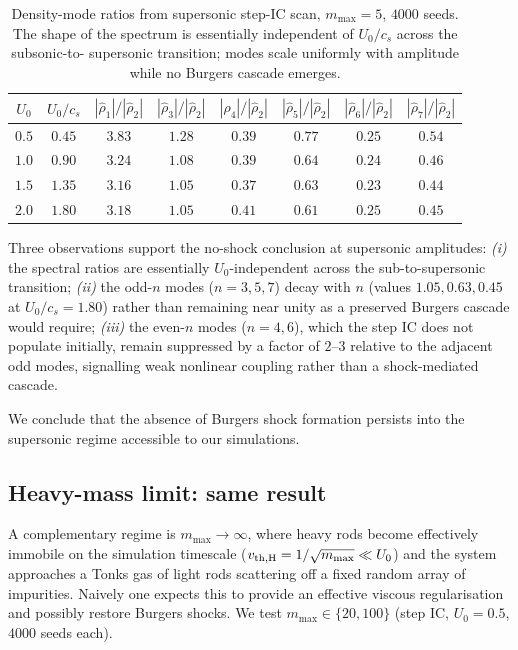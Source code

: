 \documentclass[aps,pre,twocolumn,superscriptaddress,longbibliography,floatfix]{revtex4-2}
\begin{document}
\begin{table}[t]
\centering
\caption{Density-mode ratios from supersonic step-IC scan,
$m_{\max}=5$, $4000$ seeds. The shape of the spectrum is
essentially independent of $U_0/c_s$ across the subsonic-to-%
supersonic transition; modes scale uniformly with amplitude
while no Burgers cascade emerges.}
\label{tab:super}
\begin{tabular}{cccccccc}
\hline\hline
$U_0$ & $U_0/c_s$ & $|\hat\rho_1|/|\hat\rho_2|$
       & $|\hat\rho_3|/|\hat\rho_2|$
       & $|\hat\rho_4|/|\hat\rho_2|$
       & $|\hat\rho_5|/|\hat\rho_2|$
       & $|\hat\rho_6|/|\hat\rho_2|$
       & $|\hat\rho_7|/|\hat\rho_2|$\\
\hline
$0.5$ & $0.45$ & $3.83$ & $1.28$ & $0.39$ & $0.77$ & $0.25$ & $0.54$\\
$1.0$ & $0.90$ & $3.24$ & $1.08$ & $0.39$ & $0.64$ & $0.24$ & $0.46$\\
$1.5$ & $1.35$ & $3.16$ & $1.05$ & $0.37$ & $0.63$ & $0.23$ & $0.44$\\
$2.0$ & $1.80$ & $3.18$ & $1.05$ & $0.41$ & $0.61$ & $0.25$ & $0.45$\\
\hline\hline
\end{tabular}
\end{table}

Three observations support the no-shock conclusion at
supersonic amplitudes:
\emph{(i)} the spectral ratios are essentially $U_0$-independent
across the sub-to-supersonic transition;
\emph{(ii)} the odd-$n$ modes ($n=3,5,7$) decay with $n$
(values $1.05, 0.63, 0.45$ at $U_0/c_s=1.80$) rather than
remaining near unity as a preserved Burgers cascade would
require;
\emph{(iii)} the even-$n$ modes ($n=4,6$), which the step IC
does not populate initially, remain suppressed by a factor of
$2$--$3$ relative to the adjacent odd modes, signalling weak
nonlinear coupling rather than a shock-mediated cascade.

We conclude that the absence of Burgers shock formation persists
into the supersonic regime accessible to our simulations.

\subsection{Heavy-mass limit: same result}
\label{sec:heavy}

A complementary regime is $m_{\max}\to\infty$, where heavy rods
become effectively immobile on the simulation timescale
($v_{\rm th, H}=1/\sqrt{m_{\max}}\ll U_0$) and the system
approaches a Tonks gas of light rods scattering off a fixed
random array of impurities. Naively one expects this to
provide an effective viscous regularisation and possibly
restore Burgers shocks. We test $m_{\max}\in\{20, 100\}$
(step IC, $U_0=0.5$, $4000$ seeds each).
\end{document}

